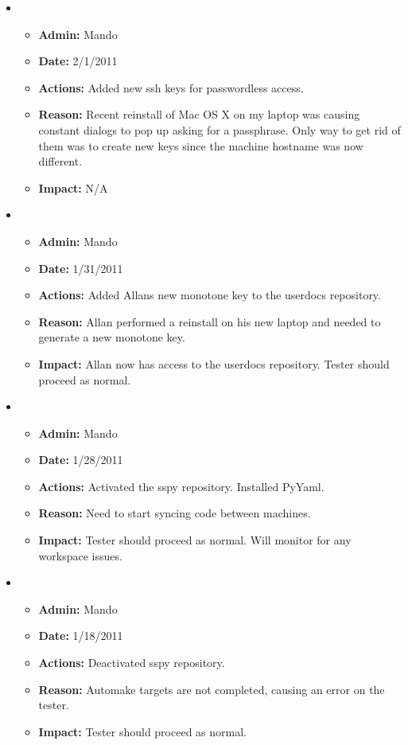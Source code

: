 \documentclass[12pt]{article}
\begin{document}
\begin{itemize}
\item
\begin{itemize}
\item[] {\bf Admin:} Mando
\item[] {\bf Date:} 2/1/2011 
\item[] {\bf Actions:}  Added new ssh keys for passwordless access.
\item[] {\bf Reason:} Recent reinstall of Mac OS X on my laptop was causing constant dialogs to pop up asking for a passphrase. Only way to get rid of them was to create new keys since the machine hostname was now different.
\item[] {\bf Impact:}  N/A
\end{itemize}

\item
\begin{itemize}
\item[] {\bf Admin:} Mando
\item[] {\bf Date:} 1/31/2011 
\item[] {\bf Actions:}  Added Allans new monotone key to the userdocs repository.
\item[] {\bf Reason:} Allan performed a reinstall on his new laptop and needed to generate a new monotone key.
\item[] {\bf Impact:}  Allan now has access to the userdocs repository. Tester should proceed as normal. 
\end{itemize}

\item
\begin{itemize}
\item[] {\bf Admin:} Mando
\item[] {\bf Date:} 1/28/2011 
\item[] {\bf Actions:}  Activated the sspy repository. Installed PyYaml.
\item[] {\bf Reason:} Need to start syncing code between machines. 
\item[] {\bf Impact:}  Tester should proceed as normal. Will monitor for any workspace issues.
\end{itemize}


\item
\begin{itemize}
\item[] {\bf Admin:} Mando
\item[] {\bf Date:} 1/18/2011 
\item[] {\bf Actions:}  Deactivated sspy repository.
\item[] {\bf Reason:} Automake targets are not completed, causing an error on the tester.
\item[] {\bf Impact:}  Tester should proceed as normal.
\end{itemize}


\end{itemize}
\end{document}
